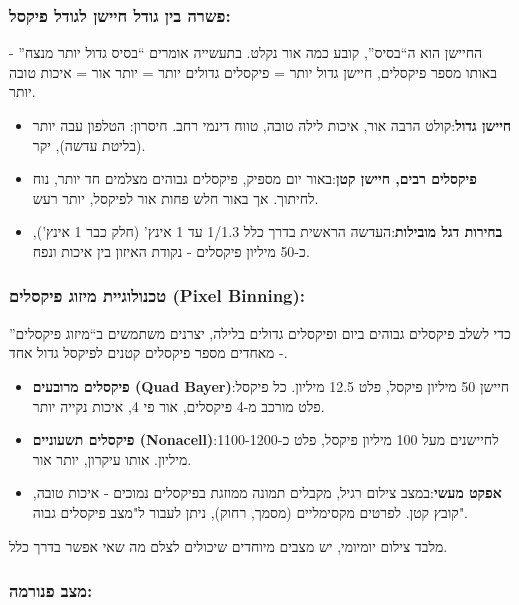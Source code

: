 \subsubsection*{פשרה בין גודל חיישן לגודל פיקסל:}

החיישן הוא ה“בסיס”, קובע כמה אור נקלט. בתעשייה אומרים “בסיס גדול יותר מנצח” - באותו מספר פיקסלים, חיישן גדול יותר = פיקסלים גדולים יותר = יותר אור = איכות טובה יותר.

\begin{itemize}
  \item \textbf{חיישן גדול}:קולט הרבה אור, איכות לילה טובה, טווח דינמי רחב. חיסרון: הטלפון עבה יותר (בליטת עדשה), יקר.
  \item \textbf{פיקסלים רבים, חיישן קטן}:באור יום מספיק, פיקסלים גבוהים מצלמים חד יותר, נוח לחיתוך. אך באור חלש פחות אור לפיקסל, יותר רעש.
  \item \textbf{בחירות דגל מובילות}:העדשה הראשית בדרך כלל 1/1.3 עד 1 אינץ' (חלק כבר 1 אינץ'), כ-50 מיליון פיקסלים - נקודת האיזון בין איכות ונפח.
\end{itemize}

\subsubsection*{טכנולוגיית מיזוג פיקסלים (Pixel Binning):}

כדי לשלב פיקסלים גבוהים ביום ופיקסלים גדולים בלילה, יצרנים משתמשים ב“מיזוג פיקסלים” - מאחדים מספר פיקסלים קטנים לפיקסל גדול אחד.

\begin{itemize}
  \item \textbf{פיקסלים מרובעים (Quad Bayer)}:חיישן 50 מיליון פיקסל, פלט 12.5 מיליון. כל פיקסל פלט מורכב מ-4 פיקסלים, אור פי 4, איכות נקייה יותר.
  \item \textbf{פיקסלים תשעוניים (Nonacell)}:לחיישנים מעל 100 מיליון פיקסל, פלט כ-1100-1200 מיליון. אותו עיקרון, יותר אור.
  \item \textbf{אפקט מעשי}:במצב צילום רגיל, מקבלים תמונה ממוזגת בפיקסלים נמוכים - איכות טובה, קובץ קטן. לפרטים מקסימליים (מסמך, רחוק), ניתן לעבור ל"מצב פיקסלים גבוה".
\end{itemize}


מלבד צילום יומיומי, יש מצבים מיוחדים שיכולים לצלם מה שאי אפשר בדרך כלל.

\subsubsection*{מצב פנורמה:}


